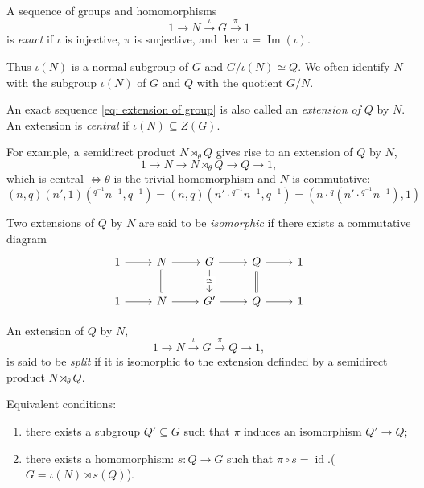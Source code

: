 \begin{definition}
  A sequence of groups and homomorphisms
  \begin{equation}
    1 \to N \xrightarrow{\iota} G \xrightarrow{\pi} 1
    \tag{*}\label{eq: extension of group}
  \end{equation}
  is \emph{exact} if \( \iota \) is injective, \( \pi \) is surjective, and \( \ker \pi = \operatorname{Im}(\iota) \).
\end{definition}
Thus \( \iota(N) \) is a normal subgroup of \( G \) and \( G / \iota(N) \simeq Q \).
We often identify \( N \) with the subgroup \( \iota(N) \) of \( G \) and \( Q \) with the quotient \( G / N \).
\begin{definition}
  An exact sequence \cref{eq: extension of group} is also called an \emph{extension of} \( Q \) by \( N \).
  An extension is \emph{central} if \( \iota(N) \subseteq Z(G) \).
\end{definition}
\begin{remark}
  For example, a semidirect product \( N \rtimes_\theta Q \) gives rise to an extension of \( Q \) by \( N \),
  \[
    1 \to N \to N \rtimes_\theta Q \to Q \to 1,
  \]
  which is central \( \iff \theta \)  is the trivial homomorphism and \( N \) is commutative:
  \[
    (n, q)(n', 1)({}^{q^{-1}}n^{-1}, q^{-1}) = (n, q)(n' \cdot {}^{q^{-1}}n^{-1}, q^{-1}) = (n \cdot {}^q (n' \cdot {}^{q^{-1}}n^{-1}), 1)
  \]
\end{remark}

\begin{definition}
  Two extensions of \( Q \) by \( N \) are said to be \emph{isomorphic} if there exists a commutative diagram
  \[\begin{tikzcd}
    1 & N & G & Q & 1 \\
    1 & N & {G'} & Q & 1
    \arrow[from=1-1, to=1-2]
    \arrow[from=1-2, to=1-3]
    \arrow[Rightarrow, no head, from=1-2, to=2-2]
    \arrow[from=1-3, to=1-4]
    \arrow["\simeq"{description}, from=1-3, to=2-3]
    \arrow[from=1-4, to=1-5]
    \arrow[Rightarrow, no head, from=1-4, to=2-4]
    \arrow[from=2-1, to=2-2]
    \arrow[from=2-2, to=2-3]
    \arrow[from=2-3, to=2-4]
    \arrow[from=2-4, to=2-5]
  \end{tikzcd}\]
\end{definition}
\begin{definition}
  An extension of \( Q \) by \( N \),
  \[
    1 \to N \xrightarrow{\iota} G \xrightarrow{\pi} Q \to 1,
  \]
  is said to be \emph{split} if it is isomorphic to the extension definded by a semidirect product \( N \rtimes_\theta Q \).
\end{definition}
\begin{remark}
  Equivalent conditions:
  \begin{enumerate}
    \item there exists a subgroup \( Q' \subseteq G \) such that \( \pi \) induces an isomorphism \( Q' \to Q \);
    \item there exists a homomorphism: \( s: Q \to G \) such that \( \pi \circ s = \operatorname{id} \).(\( G = \iota(N) \rtimes s(Q) \)).
  \end{enumerate}
\end{remark}

